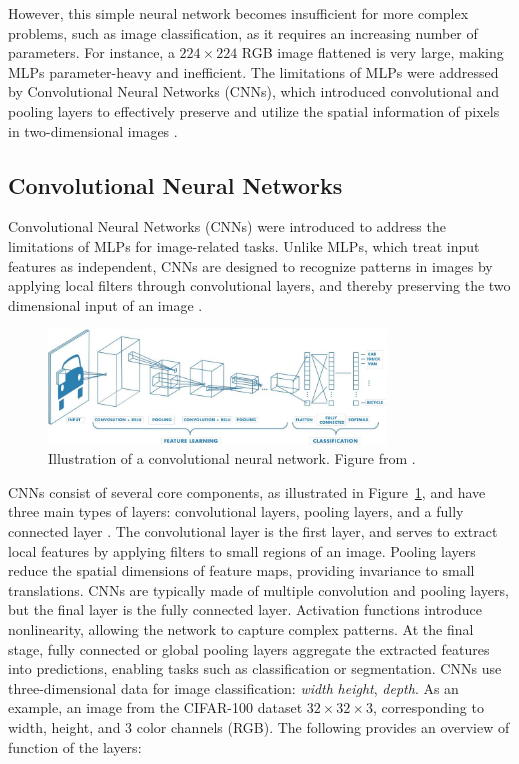 However, this simple neural network becomes insufficient for more complex problems, such as image classification, as it requires an increasing number of parameters. For instance, a $224\times 224$ RGB image flattened is very large, making MLPs parameter-heavy and inefficient. The limitations of MLPs were addressed by Convolutional Neural Networks (CNNs), which introduced convolutional and pooling layers to effectively preserve and utilize the spatial information of pixels in two-dimensional images \cite{zhang2023dive}.



\subsection{Convolutional Neural Networks}
\label{sec:CNNs}
Convolutional Neural Networks (CNNs) \cite{lecun1995} were introduced to address the limitations of MLPs for image-related tasks. Unlike MLPs, which treat input features as independent, CNNs are designed to recognize patterns in images by applying local filters through convolutional layers, and thereby preserving the two dimensional input of an image \cite{lecun1998,NIPS2012_c399862d,zhang2023dive}. 

\begin{figure}[ht]
    \centering
    \includegraphics[width=0.8\textwidth]{Images/CNN_illustration.jpg} 
    \caption{Illustration of a convolutional neural network. Figure from \cite{mathworks_cnn}. }
    \label{fig:cnn_illustration}
\end{figure}

\noindent CNNs consist of several core components, as illustrated in Figure~\ref{fig:cnn_illustration}, and have three main types of layers: convolutional layers, pooling layers, and a fully connected layer \cite{cs231n}. The convolutional layer is the first layer, and serves to extract local features by applying filters to small regions of an image. Pooling layers reduce the spatial dimensions of feature maps, providing invariance to small translations. CNNs are typically made of multiple convolution and pooling layers, but the final layer is the fully connected layer. Activation functions introduce nonlinearity, allowing the network to capture complex patterns. At the final stage, fully connected or global pooling layers aggregate the extracted features into predictions, enabling tasks such as classification or segmentation. CNNs use three-dimensional data for image classification: \emph{width} \emph{height}, \emph{depth}. As an example, an image from the CIFAR-100 dataset $32\times 32\times 3$, corresponding to width, height, and 3 color channels (RGB). The following provides an overview of function of the layers:

